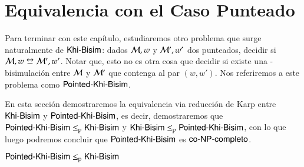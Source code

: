  


    

\section{Equivalencia con el Caso Punteado}

Para terminar con este capítulo, estudiaremos otro problema que surge naturalmente de $\rm\textsf{Khi-Bisim}$: dados $\mathcal{M},w$ y $\mathcal{M}',w'$ 
dos \ultss punteados, decidir si $\modults,w \bisim \modults',w'$. Notar que, esto no es otra cosa que decidir si existe una 
\KHilogic-bisimulación entre $\mathcal{M}$ y $\mathcal{M}'$ que contenga al par $(w,w')$. Nos referiremos a este problema como $\rm\textsf{Pointed-Khi-Bisim}$.

En esta sección demostraremos la equivalencia via reducción de Karp entre $\rm\textsf{Khi-Bisim}$ y $\rm\textsf{Pointed-Khi-Bisim}$, es decir, demostraremos que 
$\rm\textsf{Pointed-Khi-Bisim} \leq_p \rm\textsf{Khi-Bisim}$ y $\rm\textsf{Khi-Bisim} \leq_p \rm\textsf{Pointed-Khi-Bisim}$, con lo que luego podremos concluir que $\rm\textsf{Pointed-Khi-Bisim}$ es $\rm\textsf{co-NP-completo}$.

\begin{lema}\label{lema:pointed-to-general}
    $\rm\textsf{Pointed-Khi-Bisim} \leq_p \rm\textsf{Khi-Bisim}$
\end{lema}


